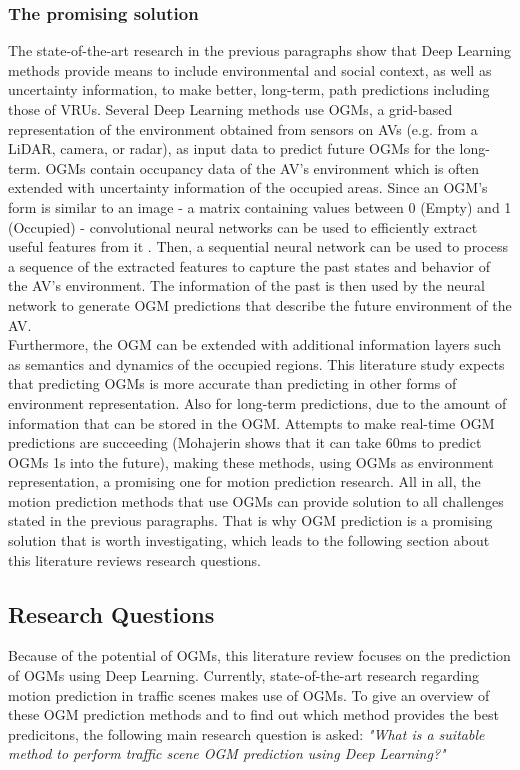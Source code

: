 \subsubsection{The promising solution}
The state-of-the-art research in the previous paragraphs show that Deep Learning methods provide means to include environmental and social context, as well as uncertainty information, to make better, long-term, path predictions including those of \glspl{VRU}. Several Deep Learning methods use \glspl{OGM}, a grid-based representation of the environment obtained from sensors on \glspl{AV} (e.g. from a LiDAR, camera, or radar), as input data to predict future \glspl{OGM} for the long-term. \glspl{OGM} contain occupancy data of the \gls{AV}'s environment which is often extended with uncertainty information of the occupied areas. 
Since an \gls{OGM}'s form is similar to an image - a matrix containing values between 0 (Empty) and 1 (Occupied) - convolutional neural networks can be used to efficiently extract useful features from it \cite{albawi2017understanding}. Then, a sequential neural network can be used to process a sequence of the extracted features to capture the past states and behavior of the \gls{AV}'s environment. The information of the past is then used by the neural network to generate \gls{OGM} predictions that describe the future environment of the \gls{AV}. \\
Furthermore, the \gls{OGM} can be extended with additional information layers such as semantics and dynamics of the occupied regions. This literature study expects that predicting \glspl{OGM} is more accurate than predicting in other forms of environment representation. Also for long-term predictions, due to the amount of information that can be stored in the \gls{OGM}. Attempts to make real-time \gls{OGM} predictions are succeeding (Mohajerin \cite{mohajerin2019multi} shows that it can take 60ms to predict \glspl{OGM} 1s into the future), making these methods, using \glspl{OGM} as environment representation, a promising one for motion prediction research. All in all, the motion prediction methods that use \glspl{OGM} can provide solution to all challenges stated in the previous paragraphs. That is why \gls{OGM} prediction is a promising solution that is worth investigating, which leads to the following section about this literature reviews research questions. \\

\subsection{Research Questions}
Because of the potential of \glspl{OGM}, this literature review focuses on the prediction of \glspl{OGM} using Deep Learning. Currently, state-of-the-art research regarding motion prediction in traffic scenes makes use of \glspl{OGM}. To give an overview of these \gls{OGM} prediction methods and to find out which method provides the best predicitons, the following main research question is asked: \textit{"What is a suitable method to perform traffic scene \gls{OGM} prediction using Deep Learning?"} \\

